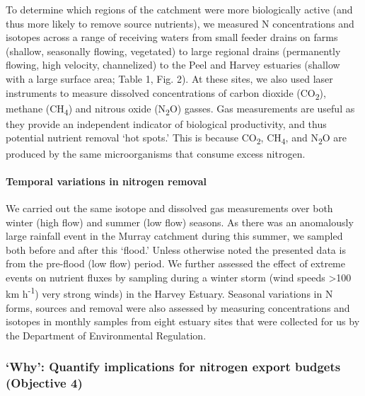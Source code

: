 \documentclass[
]{book}
\begin{document}
To determine which regions of the catchment were more biologically active (and thus more likely to remove source nutrients), we measured N concentrations and isotopes across a range of receiving waters from small feeder drains on farms (shallow, seasonally flowing, vegetated) to large regional drains (permanently flowing, high velocity, channelized) to the Peel and Harvey estuaries (shallow with a large surface area; Table 1, Fig. 2). At these sites, we also used laser instruments to measure dissolved concentrations of carbon dioxide (CO\textsubscript{2}), methane (CH\textsubscript{4}) and nitrous oxide (N\textsubscript{2}O) gasses. Gas measurements are useful as they provide an independent indicator of biological productivity, and thus potential nutrient removal `hot spots.' This is because CO\textsubscript{2}, CH\textsubscript{4}, and N\textsubscript{2}O are produced by the same microorganisms that consume excess nitrogen.~

\hypertarget{temporal-variations-in-nitrogen-removal}{%
\paragraph{Temporal variations in nitrogen removal}\label{temporal-variations-in-nitrogen-removal}}

We carried out the same isotope and dissolved gas measurements over both winter (high flow) and summer (low flow) seasons. As there was an anomalously large rainfall event in the Murray catchment during this summer, we sampled both before and after this `flood.' Unless otherwise noted the presented data is from the pre-flood (low flow) period. We further assessed the effect of extreme events on nutrient fluxes by sampling during a winter storm (wind speeds \textgreater100 km h\textsuperscript{-1}) very strong winds) in the Harvey Estuary. Seasonal variations in N forms, sources and removal were also assessed by measuring concentrations and isotopes in monthly samples from eight estuary sites that were collected for us by the Department of Environmental Regulation.~

\hypertarget{why-quantify-implications-for-nitrogen-export-budgets-objective-4}{%
\subsubsection{`Why': Quantify implications for nitrogen export budgets (Objective 4)}\label{why-quantify-implications-for-nitrogen-export-budgets-objective-4}}
\end{document}
